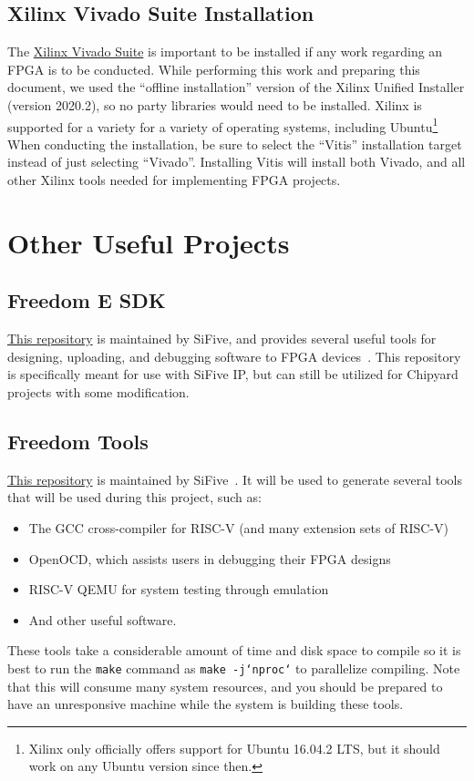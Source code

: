 \subsection{Xilinx Vivado Suite Installation}\label{sec:Xilinx_Vivado_Suide_Install}
The \href{https://www.xilinx.com/support/download.html}{Xilinx Vivado Suite} is important to be installed if any work regarding an FPGA is to be conducted.
While performing this work and preparing this document, we used the ``offline installation'' version of the Xilinx Unified Installer (version 2020.2), so no  party libraries would need to be installed.
Xilinx is supported for a variety for a variety of operating systems, including Ubuntu\footnote{Xilinx only officially offers support for Ubuntu 16.04.2 LTS, but it should work on any Ubuntu version since then.}
When conducting the installation, be sure to select the ``Vitis'' installation target instead of just selecting ``Vivado''.
Installing Vitis will install both Vivado, and all other Xilinx tools needed for implementing FPGA projects.

\section{Other Useful Projects}\label{sec:Other_Useful_Projects}
\subsection{Freedom E SDK}\label{sec:Freedom_E_SDK}
\href{https://github.com/sifive/freedom-e-sdk}{This repository} is maintained by SiFive, and provides several useful tools for designing, uploading, and debugging software to FPGA devices~\cite{freedomESDK}.
This repository is specifically meant for use with SiFive IP, but can still be utilized for Chipyard projects with some modification.

\subsection{Freedom Tools}\label{sec:Freedom_Tools}
\href{https://github.com/sifive/freedom-tools}{This repository} is maintained by SiFive~\cite{freedomTools}.
It will be used to generate several tools that will be used during this project, such as:
\begin{itemize}
\item The GCC cross-compiler for RISC-V (and many extension sets of RISC-V)
\item OpenOCD, which assists users in debugging their FPGA designs
\item RISC-V QEMU for system testing through emulation
\item And other useful software.
\end{itemize}

These tools take a considerable amount of time and disk space to compile so it is best to run the \texttt{make} command as \texttt{make -j`nproc`} to parallelize compiling.
Note that this will consume many system resources, and you should be prepared to have an unresponsive machine while the system is building these tools.

